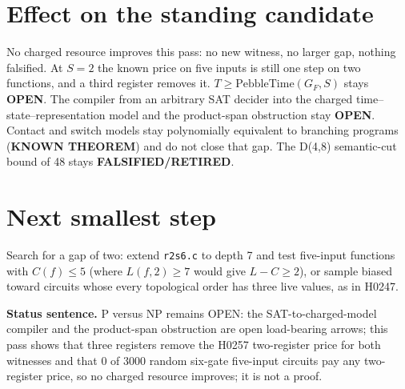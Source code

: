 \documentclass[11pt]{article}
\begin{document}
\section*{Effect on the standing candidate}
No charged resource improves this pass: no new witness, no larger gap, nothing falsified. At $S=2$ the known price on five inputs is still one step on two functions, and a third register removes it. $T\ge\mathrm{PebbleTime}(G_F,S)$ stays \textbf{OPEN}. The compiler from an arbitrary SAT decider into the charged time--state--representation model and the product-span obstruction stay \textbf{OPEN}. Contact and switch models stay polynomially equivalent to branching programs (\textbf{KNOWN THEOREM}) and do not close that gap. The D(4,8) semantic-cut bound of 48 stays \textbf{FALSIFIED/RETIRED}.

\section*{Next smallest step}
Search for a gap of two: extend \texttt{r2s6.c} to depth 7 and test five-input functions with $C(f)\le5$ (where $L(f,2)\ge7$ would give $L-C\ge2$), or sample biased toward circuits whose every topological order has three live values, as in H0247.

\bigskip
\noindent\textbf{Status sentence.} P versus NP remains OPEN: the SAT-to-charged-model compiler and the product-span obstruction are open load-bearing arrows; this pass shows that three registers remove the H0257 two-register price for both witnesses and that 0 of 3000 random six-gate five-input circuits pay any two-register price, so no charged resource improves; it is not a proof.
\end{document}
